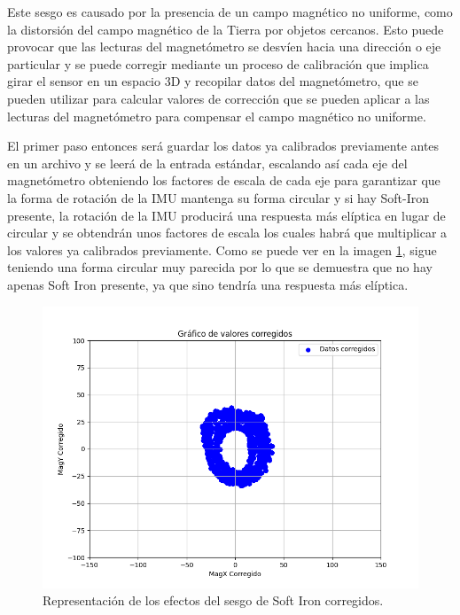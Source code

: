 Este sesgo es causado por la presencia de un campo magnético no uniforme, como la distorsión del campo magnético de la Tierra por objetos cercanos. Esto puede provocar que las lecturas del magnetómetro se desvíen hacia una dirección o eje particular y se puede corregir mediante un proceso de calibración que implica girar el sensor en un espacio 3D y recopilar datos del magnetómetro, que se pueden utilizar para calcular valores de corrección que se pueden aplicar a las lecturas del magnetómetro para compensar el campo magnético no uniforme.

El primer paso entonces será guardar los datos ya calibrados previamente antes en un archivo y se leerá de la entrada estándar, escalando así cada eje del magnetómetro obteniendo los factores de escala de cada eje para garantizar que la forma de rotación de la IMU mantenga su forma circular y si hay Soft-Iron presente, la rotación de la IMU producirá una respuesta más elíptica en lugar de circular y se obtendrán unos factores de escala los cuales habrá que multiplicar a los valores ya calibrados previamente. Como se puede ver en la imagen \ref{fig:softiron}, sigue teniendo una forma circular muy parecida por lo que se demuestra que no hay apenas Soft Iron presente, ya que sino tendría una respuesta más elíptica.

\begin{figure}[H]
  \centering
  \includegraphics[scale=0.6]{figs/soft_iron_calibration} %
  \caption{ Representación de los efectos del sesgo de Soft Iron corregidos.}
  \label{fig:softiron}
\end{figure} 


